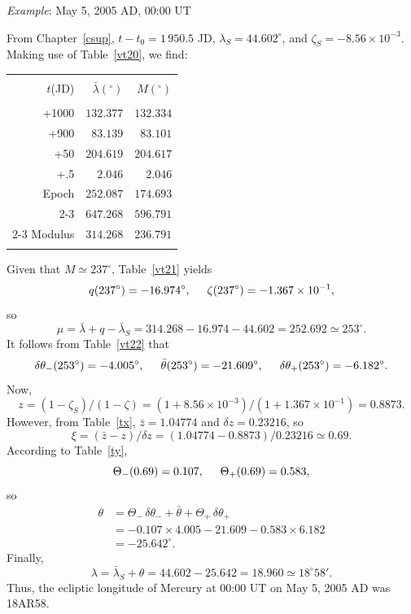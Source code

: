 \begin{center}
 {\em Example}: May 5,  2005 AD, 00:00 UT
\end{center}
From Chapter~\ref{csup}, $t-t_0=1\,950.5$ JD, $\lambda_S= 44.602^\circ$, and
$\zeta_S= -8.56\times 10^{-3}$. Making use of
Table~\ref{vt20}, we find:
\begin{center}
\begin{tabular}{rrr}
&&\\
$t$(JD) & $ \bar{\lambda}(^\circ)$ & $M(^\circ)$\\[-2ex]
&&\\
+1000 & $132.377$ & $132.334$\\
+900 & $83.139$ & $83.101$\\
+50 & $204.619$ & $204.617$\\
+.5 & $2.046$ & $2.046$\\
Epoch & $252.087$ & $174.693$\\\cline{2-3}
&$647.268$ & $596.791$\\\cline{2-3}
Modulus & $314.268$ & $236.791$\\ 
&&\\
\end{tabular}
\end{center}
Given that $M\simeq 237^\circ$, Table~\ref{vt21} yields 
$$
q(237^\circ)= -16.974^\circ, \mbox{\hspace{0.5cm}}\zeta(237^\circ)=-1.367\times 10^{-1},
$$
so
$$
\mu=\bar{\lambda}+q-\bar{\lambda}_S = 314.268-16.974-44.602= 252.692\simeq
253^\circ.
$$
It follows from Table~\ref{vt22}
that 
$$
\delta\theta_-(253^\circ) = -4.005^\circ,\mbox{\hspace{0.5cm}}\bar{\theta}(253^\circ)=-21.609^\circ, \mbox{\hspace{0.5cm}}\delta\theta_+(253^\circ) = -6.182^\circ.
$$
Now, 
$$
z= (1-\zeta_S)/(1-\zeta) = (1+8.56\times 10^{-3})/(1+1.367\times 10^{-1}) =
0.8873.
$$
However, from Table~\ref{tx}, $\bar{z}= 1.04774$ and $\delta z = 0.23216$, so
$$
\xi = (\bar{z}-z)/\delta z = (1.04774-0.8873)/0.23216 \simeq 0.69.
$$
According to Table~\ref{ty}, 
$$
\Theta_-(0.69) = 0.107, \mbox{\hspace{0.5cm}}\Theta_+(0.69) = 0.583,
$$
so
\begin{align*}
\theta  &= \Theta_-\,\delta\theta_- + \bar{\theta}+\Theta_+\,\delta\theta_+ \\[0.5ex]
&= -0.107\times 4.005 -21.609-0.583\times 6.182 \\[0.5ex]
&= -25.642^\circ.
\end{align*}
Finally,
$$
\lambda=\bar{\lambda}_S + \theta= 44.602-25.642=18.960 \simeq 18^\circ 58'. 
$$
Thus,
the ecliptic longitude of Mercury at 00:00 UT on May 5, 2005 AD was 18AR58.

